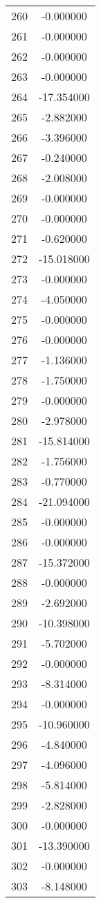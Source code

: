 \documentclass[12pt]{article}
\begin{document}
\begin{longtable}{@{}cc@{}}
260 & -0.000000 \\
261 & -0.000000 \\
262 & -0.000000 \\
263 & -0.000000 \\
264 & -17.354000 \\
265 & -2.882000 \\
266 & -3.396000 \\
267 & -0.240000 \\
268 & -2.008000 \\
269 & -0.000000 \\
270 & -0.000000 \\
271 & -0.620000 \\
272 & -15.018000 \\
273 & -0.000000 \\
274 & -4.050000 \\
275 & -0.000000 \\
276 & -0.000000 \\
277 & -1.136000 \\
278 & -1.750000 \\
279 & -0.000000 \\
280 & -2.978000 \\
281 & -15.814000 \\
282 & -1.756000 \\
283 & -0.770000 \\
284 & -21.094000 \\
285 & -0.000000 \\
286 & -0.000000 \\
287 & -15.372000 \\
288 & -0.000000 \\
289 & -2.692000 \\
290 & -10.398000 \\
291 & -5.702000 \\
292 & -0.000000 \\
293 & -8.314000 \\
294 & -0.000000 \\
295 & -10.960000 \\
296 & -4.840000 \\
297 & -4.096000 \\
298 & -5.814000 \\
299 & -2.828000 \\
300 & -0.000000 \\
301 & -13.390000 \\
302 & -0.000000 \\
303 & -8.148000 \\

\end{longtable}
\end{document}
